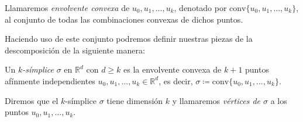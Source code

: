 \begin{definition}
\begin{sloppypar}
Llamaremos \emph{envolvente convexa} de $u_0, u_1, ..., u_k$, denotado por ${\text{conv}\{u_0, u_1, ..., u_k\}}$, al conjunto de todas las combinaciones convexas de dichos puntos.
\end{sloppypar}
\end{definition}
Haciendo uso de este conjunto podremos definir nuestras piezas de la descomposición de la siguiente manera:

\begin{definition}
Un \emph{$k$\textit{-símplice}} $\sigma$ en $\mathbb{R}^d$ con $d \geq k$ es la envolvente convexa de $k+1$ puntos afínmente independientes  $u_0, u_1, ..., u_k \in \mathbb{R}^d$, es decir,
$\sigma \coloneqq \text{conv}\{u_0, u_1, ..., u_k\}$.
\end{definition}

Diremos que el $k$-símplice $\sigma$ tiene dimensión $k$ y llamaremos \emph{vértices de $\sigma$} a los puntos $u_0, u_1, ..., u_k$.

